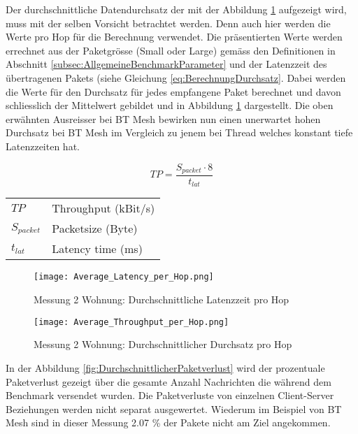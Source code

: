 Der durchschnittliche Datendurchsatz der mit der Abbildung \ref{fig:DurchschnittlicherDurchsatz} aufgezeigt wird, muss mit der selben Vorsicht betrachtet werden. Denn auch hier werden die Werte pro Hop für die Berechnung verwendet.
Die präsentierten Werte werden errechnet aus der Paketgrösse (Small oder Large) gemäss den Definitionen in Abschnitt \ref{subsec:AllgemeineBenchmarkParameter} und der Latenzzeit des übertragenen Pakets (siehe Gleichung \ref{eq:BerechnungDurchsatz}.
Dabei werden die Werte für den Durchsatz für jedes empfangene Paket berechnet und davon schliesslich der Mittelwert gebildet und in Abbildung \ref{fig:DurchschnittlicherDurchsatz} dargestellt.
Die oben erwähnten Ausreisser bei BT Mesh bewirken nun einen unerwartet hohen Durchsatz bei BT Mesh im Vergleich zu jenem bei Thread welches konstant tiefe Latenzzeiten hat.

\begin{equation}\label{eq:BerechnungDurchsatz}
TP =  \frac{S_{packet} \cdot 8}{t_{lat}}
\end{equation}

\begin{small}
\begin{center}
\begin{tabular}{ll}
$TP$ & Throughput (kBit/s)\\
$S_{packet}$ & Packetsize (Byte)\\
$t_{lat}$ & Latency time (ms)\\
\end{tabular}
\end{center}
\end{small}

\begin{figure}[!htbp]
\centering
\begin{minipage}[b]{0.49\textwidth}
		\centering
		\texttt{[image: Average\_Latency\_per\_Hop.png]}
		\caption{Messung 2 Wohnung: Durchschnittliche Latenzzeit pro Hop}
		\label{fig:DurchschnittlicheLatenzzeit}
\end{minipage}
\begin{minipage}[b]{0.49\textwidth}
		\centering
		\texttt{[image: Average\_Throughput\_per\_Hop.png]}
		\caption{Messung 2 Wohnung: Durchschnittlicher Durchsatz pro Hop}
		\label{fig:DurchschnittlicherDurchsatz}
\end{minipage}
\end{figure}

In der Abbildung \ref{fig:DurchschnittlicherPaketverlust} wird der prozentuale Paketverlust gezeigt über die gesamte Anzahl Nachrichten die während dem Benchmark versendet wurden.
Die Paketverluste von einzelnen Client-Server Beziehungen werden nicht separat ausgewertet.
Wiederum im Beispiel von BT Mesh sind in dieser Messung 2.07 \% der Pakete nicht am Ziel angekommen.

